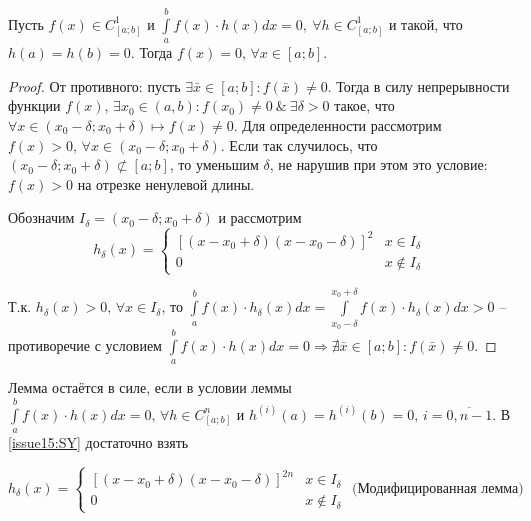\begin{lemma}
    Пусть $f(x) \in C^1_{[a;b]}$ и $\int \limits_a^b f(x) \cdot h(x) dx = 0,~ \forall h \in C^1_{[a;b]}$ и такой, что $h(a) = h(b) = 0$. Тогда $f(x) = 0 ,\, \forall x \in [a;b]$.
\end{lemma}

\begin{proof}
    От противного: пусть $\exists \bar{x} \in [a;b]: f(\bar{x}) \neq 0$. Тогда в силу непрерывности функции $f(x)$, $\exists x_0 \in (a, b): f(x_0) \neq 0 ~\&~ \exists \delta > 0$ такое, что $\forall x \in (x_0 - \delta; x_0 + \delta) \mapsto f(x) \neq 0$. 
    Для определенности рассмотрим $f(x) > 0, \, \forall x \in (x_0 - \delta; x_0 + \delta)$. 
    Если так случилось, что $(x_0 - \delta; x_0 + \delta) \not\subset [a;b]$, то уменьшим $\delta$, не нарушив при этом это условие: $f(x) > 0$ на отрезке ненулевой длины. 

    Обозначим $I_{\delta} = (x_0 - \delta; x_0 + \delta)$ и рассмотрим 
    \begin{equation} \label{issue15:SY}
        h_{\delta}(x) = \begin{cases}
            \left[(x - x_0 + \delta)(x - x_0 - \delta)\right]^2 & x \in I_{\delta}\\
            0 & x \not\in I_{\delta}
            \end{cases}
    \end{equation}
    
    Т.к. $h_{\delta}(x) > 0, \, \forall x \in I_{\delta}$, то $\int \limits_a^b f(x) \cdot h_{\delta}(x) dx  = \int \limits_{x_0 - \delta}^{x_0 + \delta} f(x) \cdot h_{\delta}(x) dx > 0$ 
    -- противоречие с условием $\int \limits_a^b f(x) \cdot h(x) dx = 0  \Rightarrow \nexists \bar{x} \in [a;b]: f(\bar{x}) \neq 0$. 
    \end{proof}

    \begin{remark}
    
        Лемма остаётся в силе, если в условии леммы $\int \limits_a^b f(x) \cdot h(x) dx = 0, \, \forall h \in C^n_{[a;b]}$ и $h^{(i)}(a) = h^{(i)}(b) = 0, \, i = \overline{0, n-1}$. В \eqref{issue15:SY} достаточно взять 

        \begin{equation} \label{issue15:SY}
            h_{\delta}(x) = \begin{cases}
                \left[(x - x_0 + \delta)(x - x_0 - \delta)\right]^{2n} & x \in I_{\delta}\\
                0 & x \not\in I_{\delta}
                \end{cases} 
                \text{  (Модифицированная лемма)}
        \end{equation}
    \end{remark}
    
